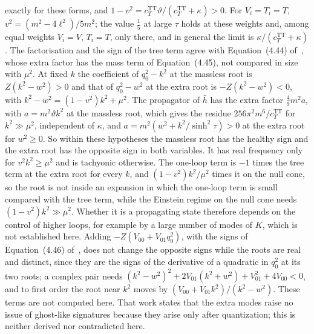 exactly for these forms, and \(1-v^2=c_T^{\mathrm{TT}}\vartheta/(c_T^{\mathrm{TT}}+\kappa)>0\). For \(V_i=T_i=T\), \(v^2=(m^2-4\ell^2)/5m^2\); the value \(\tfrac15\) at large \(\tau\) holds at these weights and, among equal weights \(V_i=V\), \(T_i=T\), only there, and in general the limit is \(\kappa/(c_T^{\mathrm{TT}}+\kappa)\). The factorisation and the sign of the tree term agree with Equation~(4.44) of~\cite{Steinacker2026}, whose extra factor has the mass term of Equation~(4.45), not compared in size with \(\mu^2\). At fixed \(k\) the coefficient of \(q_0^2-k^2\) at the massless root is \(Z(k^2-w^2)>0\) and that of \(q_0^2-w^2\) at the extra root is \(-Z(k^2-w^2)<0\), with \(k^2-w^2=(1-v^2)k^2+\mu^2\). The propagator of \(\bar h\) has the extra factor \(\tfrac49m^2a\), with \(a=m^2\vartheta k^2\) at the massless root, which gives the residue \(256\pi^2m^6/c_T^{\mathrm{TT}}\) for \(k^2\gg\mu^2\), independent of \(\kappa\), and \(a=m^2(w^2+k^2/\sinh^2\tau)>0\) at the extra root for \(w^2\ge0\). So within these hypotheses the massless root has the healthy sign and the extra root has the opposite sign in both variables. It has real frequency only for \(v^2k^2\ge\mu^2\) and is tachyonic otherwise. The one-loop term is \(-1\) times the tree term at the extra root for every \(k\), and \((1-v^2)k^2/\mu^2\) times it on the null cone, so the root is not inside an expansion in which the one-loop term is small compared with the tree term, while the Einstein regime on the null cone needs \((1-v^2)k^2\gg\mu^2\). Whether it is a propagating state therefore depends on the control of higher loops, for example by a large number of modes of \(K\), which is not established here. Adding \(-Z(V_{00}+V_{01}q_0^2)\), with the signs of Equation~(4.46) of~\cite{Steinacker2026}, does not change the opposite signs while the roots are real and distinct, since they are the signs of the derivative of a quadratic in \(q_0^2\) at its two roots; a complex pair needs \((k^2-w^2)^2+2V_{01}(k^2+w^2)+V_{01}^2+4V_{00}<0\), and to first order the root near \(k^2\) moves by \((V_{00}+V_{01}k^2)/(k^2-w^2)\). These terms are not computed here. That work states that the extra modes raise no issue of ghost-like signatures because they arise only after quantization; this is neither derived nor contradicted here.

